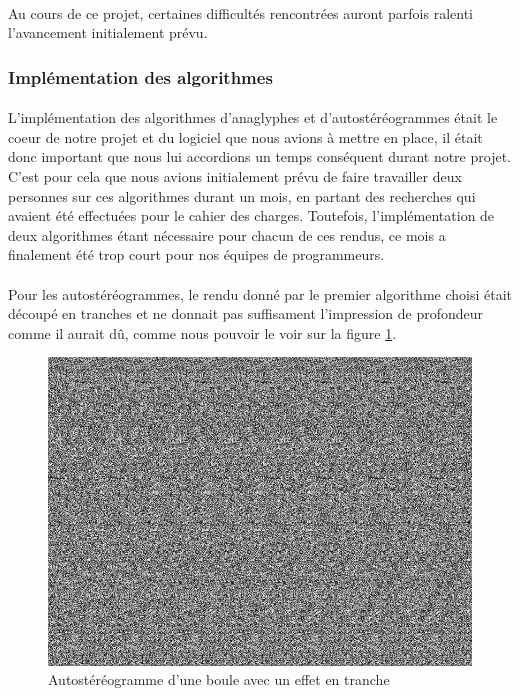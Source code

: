 \paragraph{}
Au cours de ce projet, certaines difficultés rencontrées auront parfois ralenti l'avancement initialement prévu.

\subsubsection{Implémentation des algorithmes}
\paragraph{}
L'implémentation des algorithmes d'anaglyphes et d'autostéréogrammes était le coeur de notre projet et du logiciel que nous avions à mettre en place, il était donc important que nous lui accordions un temps conséquent durant notre projet. C'est pour cela que nous avions initialement prévu de faire travailler deux personnes sur ces algorithmes durant un mois, en partant des recherches qui avaient été effectuées pour le cahier des charges. Toutefois, l'implémentation de deux algorithmes étant nécessaire pour chacun de ces rendus, ce mois a finalement été trop court pour nos équipes de programmeurs.

\paragraph{}
Pour les autostéréogrammes, le rendu donné par le premier algorithme choisi était découpé en tranches et ne donnait pas suffisament l'impression de profondeur comme il aurait dû, comme nous pouvoir le voir sur la figure \ref{fig:sphAutoste}.

\begin{figure}[h]
	\centering
	\includegraphics[scale=0.4]{bouleAutoste.png}
	\caption{\label{fig:sphAutoste} Autostéréogramme d'une boule avec un effet en tranche \protect}
\end{figure}

